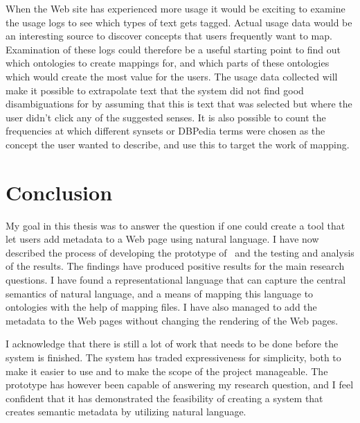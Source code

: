 When the Web site has experienced more usage it would be exciting to examine the usage logs to see which types of text gets tagged.
Actual usage data would be an interesting source to discover concepts that users frequently want to map.
Examination of these logs could therefore be a useful starting point to find out which ontologies to create mappings for,
and which parts of these ontologies which would create the most value for the users.
The usage data collected will make it possible to extrapolate text that the system did not find good disambiguations for
by assuming that this is text that was selected but where the user didn't click any of the suggested senses.
It is also possible to count the frequencies at which different synsets or DBPedia terms were chosen as the concept the
user wanted to describe, and use this to target the work of mapping.

\section{Conclusion}
My goal in this thesis was to answer the question if one could create a tool that let users add metadata to a Web page using
natural language.
I have now described the process of developing the prototype of \theartefact\ and the testing and analysis of the results.
The findings have produced positive results for the main research questions.
I have found a representational language that can capture the central semantics of natural language,
and a means of mapping this language to ontologies with the help of mapping files.
I have also managed to add the metadata to the Web pages without changing the rendering of the Web pages.

I acknowledge that there is still a lot of work that needs to be done before the system is finished.
The system has traded expressiveness for simplicity, both to make it easier to use and to make the scope of the project manageable.
The prototype has however been capable of answering my research question,
and I feel confident that it has demonstrated the feasibility of creating a system that creates semantic metadata by
utilizing natural language.
